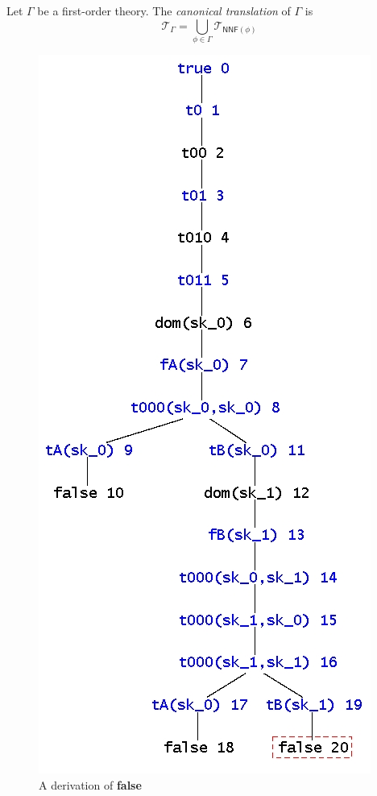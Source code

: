 \documentclass[a4paper,11pt]{article}
\newcommand{\nnf}[1]{\mathsf{NNF} #1}
\begin{document}
\begin{dfn} \label{clxl}
Let $\Gamma$ be a first-order theory.  The \emph{canonical translation} of
$\Gamma$ is
\[\mathcal{T}_\Gamma = \bigcup_{\phi \in \Gamma} \mathcal{T}_{\nnf (\phi)}\]
\end{dfn}

\begin{figure}
\begin{center}
\includegraphics{ex2.jpg}
\end{center}
\caption{A derivation of {\bf false}}
\label{fig2}
\end{figure}
\end{document}
